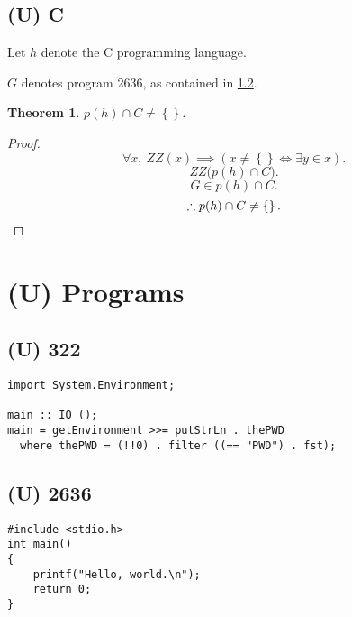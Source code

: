 \documentclass{article}
\newtheorem{thm}{Theorem}
\begin{document}
		\subsection{(U) C}
			Let $h$ denote the C programming language.

			$G$ denotes program 2636, as contained in \cref{subsection:p2636}.
			\begin{thm}
				$p(h) \cap C \neq \left\{\right\}$.
			\end{thm}
			\begin{proof}
				\[
					\forall x,\ 
					\mathit{ZZ}(x) \implies 
					\left(x \neq \left\{\right\} \iff \exists y \in x\right).
				\]
				\[
					\mathit{ZZ}\big(p(h) \cap C\big).
				\]
				\[
					G \in p(h) \cap C.
				\]
				\[
					\therefore p(h) \cap C \neq \left\{\right\}.\qedhere
				\]
			\end{proof}
	\section{(U) Programs}
		\subsection{(U) 322}\label{subsection:p322}
			\begin{lstlisting}
import System.Environment;

main :: IO ();
main = getEnvironment >>= putStrLn . thePWD
  where thePWD = (!!0) . filter ((== "PWD") . fst);
			\end{lstlisting}
		\subsection{(U) 2636}\label{subsection:p2636}
			\begin{lstlisting}
#include <stdio.h>
int main()
{
	printf("Hello, world.\n");
	return 0;
}
			\end{lstlisting}
\end{document}
